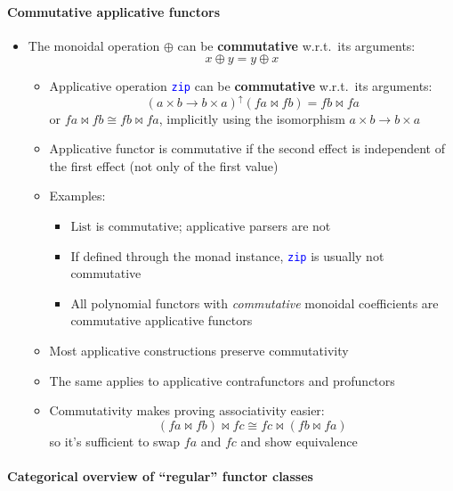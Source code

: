 \paragraph{Commutative applicative functors}
\begin{itemize}
\item \vspace{-0.15cm}The monoidal operation $\oplus$ can be \textbf{commutative}
w.r.t.\ its arguments:{\footnotesize{}
\[
x\oplus y=y\oplus x
\]
}{\footnotesize\par}
\begin{itemize}
\item Applicative operation \texttt{\textcolor{blue}{\footnotesize{}zip}}
can be \textbf{commutative} w.r.t.\ its arguments:{\footnotesize{}
\[
\left(a\times b\rightarrow b\times a\right)^{\uparrow}\left(fa\bowtie fb\right)=fb\bowtie fa
\]
}or $fa\bowtie fb\cong fb\bowtie fa$, implicitly using the isomorphism
$a\times b\rightarrow b\times a$
\item Applicative functor is commutative if the second effect is independent
of the first effect (not only of the first value)
\item Examples:
\begin{itemize}
\item $\text{List}$ is commutative; applicative parsers are not
\item If defined through the monad instance, \texttt{\textcolor{blue}{\footnotesize{}zip}}
is usually not commutative
\item All polynomial functors with \emph{commutative} monoidal coefficients
are commutative applicative functors 
\end{itemize}
\item Most applicative constructions preserve commutativity 
\item The same applies to applicative contrafunctors and profunctors 
\item Commutativity makes proving associativity easier: {\footnotesize{}
\[
\left(fa\bowtie fb\right)\bowtie fc\cong fc\bowtie\left(fb\bowtie fa\right)
\]
}so it's sufficient to swap $fa$ and $fc$ and show equivalence
\end{itemize}
\end{itemize}


\paragraph{Categorical overview of ``regular'' functor classes}

